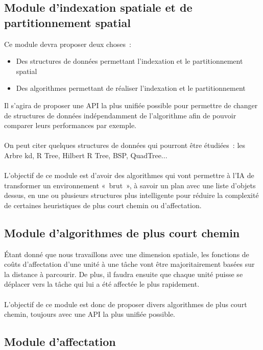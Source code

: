 \subsection{Module d'indexation spatiale et de partitionnement spatial}

Ce module devra proposer deux choses :
\begin{itemize}
\item Des structures de données permettant l'indexation et le partitionnement spatial
\item Des algorithmes permettant de réaliser l'indexation et le partitionnement
\end{itemize}

Il s'agira de proposer une API la plus unifiée possible pour permettre de changer de structures de données indépendamment de l'algorithme afin de pouvoir comparer leurs performances par exemple.\\\\

On peut citer quelques structures de données qui pourront être étudiées : les Arbre kd, R Tree, Hilbert R Tree, BSP, QuadTree...\\\\

L'objectif de ce module est d'avoir des algorithmes qui vont permettre à l'IA de transformer un environnement « brut », à savoir un plan avec une liste d'objets dessus, en une ou plusieurs structures plus intelligente pour réduire la complexité de certaines heuristiques de plus court chemin ou d'affectation.

\subsection{Module d'algorithmes de plus court chemin}

Étant donné que nous travaillons avec une dimension spatiale, les fonctions de coûts d'affectation d'une unité à une tâche vont être majoritairement basées sur la distance à parcourir. De plus, il faudra ensuite que chaque unité puisse se déplacer vers la tâche qui lui a été affectée le plus rapidement.\\\\

L'objectif de ce module est donc de proposer divers algorithmes de plus court chemin, toujours avec une API la plus unifiée possible.

\subsection{Module d'affectation}

